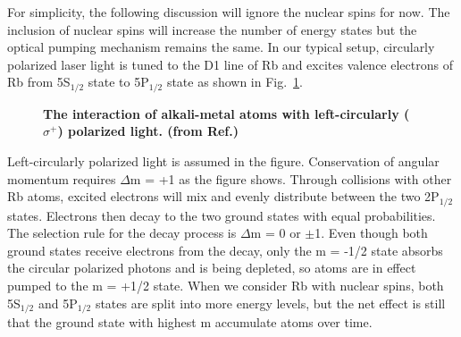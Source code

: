 For simplicity, the following discussion will ignore the nuclear spins for now. The inclusion of nuclear spins will increase the number of energy states but the optical pumping mechanism remains the same. In our typical setup, circularly polarized laser light is tuned to the D1 line of Rb and excites valence electrons of Rb from 5S$_{1/2}$ state to 5P$_{1/2}$ state as shown in Fig.~\ref{fig:OpticalPumping}\cite{WalkerHapper}. 

\begin{figure}[t!]
	\centering
	\caption{{\bf The interaction of alkali-metal atoms with left-circularly ($\sigma^{+}$) polarized light. (from Ref.\@ \cite{WalkerHapper})}}
	\label{fig:OpticalPumping}
\end{figure}

Left-circularly polarized light is assumed in the figure. Conservation of angular momentum requires $\Delta$m = +1 as the figure shows. Through collisions with other Rb atoms, excited electrons will mix and evenly distribute between the two 2P$_{1/2}$ states. Electrons then decay to the two ground states with equal probabilities. The selection rule for the decay process is $\Delta$m = 0 or $\pm$1. Even though both ground states receive electrons from the decay, only the m = -1/2 state absorbs the circular polarized photons and is being depleted, so atoms are in effect pumped to the m = +1/2 state. When we consider Rb with nuclear spins, both 5S$_{1/2}$ and 5P$_{1/2}$ states are split into more energy levels, but the net effect is still that the ground state with highest m accumulate atoms over time.


